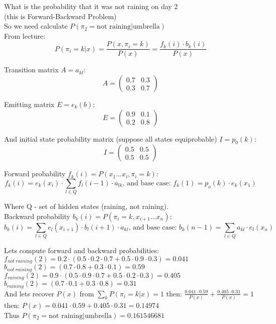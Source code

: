 \documentclass{article}
\begin{document}
What is the probability that it was not raining on day 2\\
(this is Forward-Backward Problem)\\

So we need calculate $P(\pi_2=\text{not raining}|\text{umbrella})$\\

From lecture:\\

$$
P(\pi_i=k|x) = \frac{P(x, \pi_i=k)}{P(x)} = \frac{f_k(i) \cdot b_k(i)}{P(x)}
$$

Transition matrix $A = a_{kl}$:
$$
A =
\begin{pmatrix}
  0.7 & 0.3 \\ 0.3 & 0.7
\end{pmatrix}
$$

Emitting matrix $E = e_k(b)$:
$$
E =
\begin{pmatrix}
  0.9 & 0.1 \\ 0.2 & 0.8
\end{pmatrix}
$$

And initial state probability matrix (suppose all states equiprobable) $I=p_0(k)$:
$$
I =
\begin{pmatrix}
  0.5 & 0.5 \\ 0.5 & 0.5
\end{pmatrix}
$$

Forward probability $f_k(i) = P(x_1 \dots x_i, \pi_i=k)$:
$$
f_k(i) = e_k(x_i) \cdot \sum_{l \in Q}{f_l(i-1) \cdot a_{lk}}
\text{, and base case: }
f_k(1) = p_o(k) \cdot e_k(x_1)
$$

Where Q - set of hidden states (raining, not raining).\\

Backward probability $b_k(i) = P(\pi_i=k, x_{i+1} \dots x_n)$:
$$
b_k(i) = \sum_{l \in Q}{e_l(x_{i+1}) \cdot b_l(i+1) \cdot a_{kl}}
\text{, and base case: }
b_k(n-1) = \sum_{l \in Q}{a_{kl} \cdot e_l(x_n)}
$$

Lets compute forward and backward probabilities:\\

$ f_{not \ raining}(2) = 0.2 \cdot (0.5 \cdot 0.2 \cdot 0.7 + 0.5 \cdot 0.9
\cdot 0.3) = 0.041 $\\
$ b_{not \ raining}(2) = (0.7 \cdot 0.8 + 0.3 \cdot 0.1) = 0.59$\\

$ f_{raining}(2) = 0.9 \cdot (0.5 \cdot 0.9 \cdot 0.7 + 0.5 \cdot 0.2
\cdot 0.3) = 0.405$\\
$ b_{raining}(2) = (0.7 \cdot 0.1 + 0.3 \cdot 0.8) = 0.31$\\

And lets recover $P(x)$ from
$\sum_{k}{P(\pi_i=k|x)} = 1$
then:
$\frac{0.041 \cdot 0.59}{P(x)} + \frac{0.405 \cdot 0.31}{P(x)} = 1$\\
then:
$P(x) = 0.041 \cdot 0.59 + 0.405 \cdot 0.31 = 0.14974$\\

Thus
$P(\pi_2 = \text{not raining} | \text{umbrella}) = 0.161546681$
\end{document}
